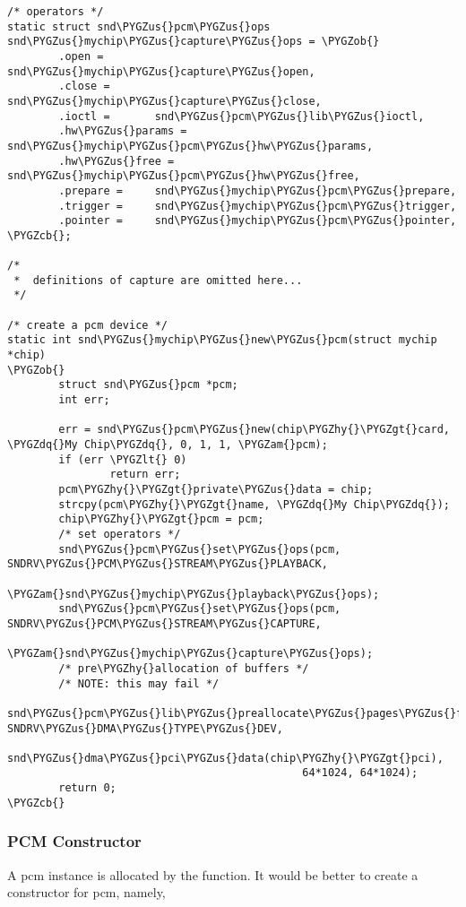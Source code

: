 \documentclass[a4paper,8pt,english]{sphinxmanual}
\def\PYGZus{\char`\_}
\def\PYGZob{\char`\{}
\def\PYGZcb{\char`\}}
\def\PYGZam{\char`\&}
\def\PYGZlt{\char`\<}
\def\PYGZgt{\char`\>}
\def\PYGZhy{\char`\-}
\def\PYGZdq{\char`\"}
\begin{document}
\begin{Verbatim}[commandchars=\\\{\}]
/* operators */
static struct snd\PYGZus{}pcm\PYGZus{}ops snd\PYGZus{}mychip\PYGZus{}capture\PYGZus{}ops = \PYGZob{}
        .open =        snd\PYGZus{}mychip\PYGZus{}capture\PYGZus{}open,
        .close =       snd\PYGZus{}mychip\PYGZus{}capture\PYGZus{}close,
        .ioctl =       snd\PYGZus{}pcm\PYGZus{}lib\PYGZus{}ioctl,
        .hw\PYGZus{}params =   snd\PYGZus{}mychip\PYGZus{}pcm\PYGZus{}hw\PYGZus{}params,
        .hw\PYGZus{}free =     snd\PYGZus{}mychip\PYGZus{}pcm\PYGZus{}hw\PYGZus{}free,
        .prepare =     snd\PYGZus{}mychip\PYGZus{}pcm\PYGZus{}prepare,
        .trigger =     snd\PYGZus{}mychip\PYGZus{}pcm\PYGZus{}trigger,
        .pointer =     snd\PYGZus{}mychip\PYGZus{}pcm\PYGZus{}pointer,
\PYGZcb{};

/*
 *  definitions of capture are omitted here...
 */

/* create a pcm device */
static int snd\PYGZus{}mychip\PYGZus{}new\PYGZus{}pcm(struct mychip *chip)
\PYGZob{}
        struct snd\PYGZus{}pcm *pcm;
        int err;

        err = snd\PYGZus{}pcm\PYGZus{}new(chip\PYGZhy{}\PYGZgt{}card, \PYGZdq{}My Chip\PYGZdq{}, 0, 1, 1, \PYGZam{}pcm);
        if (err \PYGZlt{} 0)
                return err;
        pcm\PYGZhy{}\PYGZgt{}private\PYGZus{}data = chip;
        strcpy(pcm\PYGZhy{}\PYGZgt{}name, \PYGZdq{}My Chip\PYGZdq{});
        chip\PYGZhy{}\PYGZgt{}pcm = pcm;
        /* set operators */
        snd\PYGZus{}pcm\PYGZus{}set\PYGZus{}ops(pcm, SNDRV\PYGZus{}PCM\PYGZus{}STREAM\PYGZus{}PLAYBACK,
                        \PYGZam{}snd\PYGZus{}mychip\PYGZus{}playback\PYGZus{}ops);
        snd\PYGZus{}pcm\PYGZus{}set\PYGZus{}ops(pcm, SNDRV\PYGZus{}PCM\PYGZus{}STREAM\PYGZus{}CAPTURE,
                        \PYGZam{}snd\PYGZus{}mychip\PYGZus{}capture\PYGZus{}ops);
        /* pre\PYGZhy{}allocation of buffers */
        /* NOTE: this may fail */
        snd\PYGZus{}pcm\PYGZus{}lib\PYGZus{}preallocate\PYGZus{}pages\PYGZus{}for\PYGZus{}all(pcm, SNDRV\PYGZus{}DMA\PYGZus{}TYPE\PYGZus{}DEV,
                                              snd\PYGZus{}dma\PYGZus{}pci\PYGZus{}data(chip\PYGZhy{}\PYGZgt{}pci),
                                              64*1024, 64*1024);
        return 0;
\PYGZcb{}
\end{Verbatim}


\subsubsection{PCM Constructor}
\label{sound/kernel-api/writing-an-alsa-driver:pcm-constructor}
A pcm instance is allocated by the 
function. It would be better to create a constructor for pcm, namely,
\end{document}
